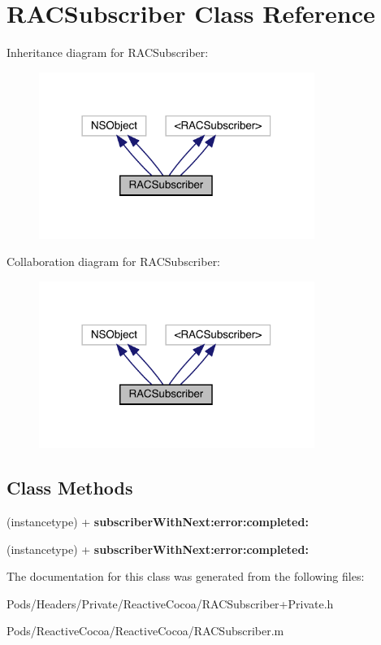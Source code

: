 \hypertarget{interface_r_a_c_subscriber}{}\section{R\+A\+C\+Subscriber Class Reference}
\label{interface_r_a_c_subscriber}


Inheritance diagram for R\+A\+C\+Subscriber\+:\nopagebreak
\begin{figure}[H]
\begin{center}
\leavevmode
\includegraphics[width=254pt]{interface_r_a_c_subscriber__inherit__graph}
\end{center}
\end{figure}


Collaboration diagram for R\+A\+C\+Subscriber\+:\nopagebreak
\begin{figure}[H]
\begin{center}
\leavevmode
\includegraphics[width=254pt]{interface_r_a_c_subscriber__coll__graph}
\end{center}
\end{figure}
\subsection*{Class Methods}
\begin{DoxyCompactItemize}
\item 
\mbox{\label{interface_r_a_c_subscriber_abbe4726dad759f4c0cdfaa84ec85289a}} 
(instancetype) + {\bfseries subscriber\+With\+Next\+:error\+:completed\+:}
\item 
\mbox{\label{interface_r_a_c_subscriber_abbe4726dad759f4c0cdfaa84ec85289a}} 
(instancetype) + {\bfseries subscriber\+With\+Next\+:error\+:completed\+:}
\end{DoxyCompactItemize}


The documentation for this class was generated from the following files\+:\begin{DoxyCompactItemize}
\item 
Pods/\+Headers/\+Private/\+Reactive\+Cocoa/R\+A\+C\+Subscriber+\+Private.\+h\item 
Pods/\+Reactive\+Cocoa/\+Reactive\+Cocoa/R\+A\+C\+Subscriber.\+m\end{DoxyCompactItemize}
